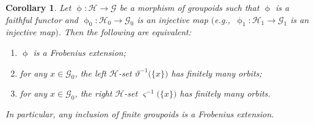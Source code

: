\documentclass[pdftex]{sigma}
\numberwithin{equation}{section}
\newtheorem{Corollary}[Theorem]{Corollary}
\newcommand{\Go}{\cG_{\Sscript{0}}}
\newcommand{\Ga}{\cG_{\Sscript{1}}}
\newcommand{\Ho}{\cH_{\Sscript{0}}}
\newcommand{\Ha}{\cH_{\Sscript{1}}}
\newcommand{\cG}{{\mathcal G}}
\newcommand{\cH}{{\mathcal H}}
\newcommand{\Sscript}[1]{\scriptscriptstyle{#1}}
\newcommand{\phia}{\upphi_{\Sscript{1}}}
\begin{document}
\begin{Corollary}\label{coro:Finite}Let $\upphi\colon \cH \to \cG$ be a morphism of groupoids such that $\upphi$ is a faithful functor and $\upphi_{\Sscript{0}}\colon \Ho \to \Go$ is an injective map $($e.g.,~$\phia\colon \Ha \to \Ga$ is an injective map$)$. Then the following are equivalent:
\begin{enumerate}[$(a)$]\itemsep=0pt
\item $\upphi$ is a Frobenius extension;
\item for any $x \in \Go$, the left $\cH$-set $\vartheta^{-1}\big( \{x\} \big)$ has finitely many orbits;
\item for any $x \in \Go$, the right $\cH$-set $\varsigma^{-1}\big( \{x\} \big)$ has finitely many orbits.
\end{enumerate}
In particular, any inclusion of finite groupoids is a Frobenius
extension.
\end{Corollary}
\end{document}
